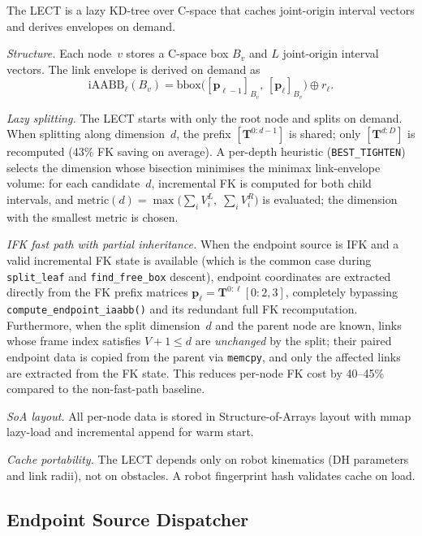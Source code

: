 \documentclass[journal]{IEEEtran}
\newcommand{\iAABB}{\text{iAABB}}
\newcommand{\bT}{\mathbf{T}}
\begin{document}
The LECT is a lazy KD-tree over C-space that caches joint-origin
interval vectors and derives envelopes on demand.

\emph{Structure.}
Each node~$v$ stores a C-space box $B_v$ and $L$ joint-origin
interval vectors.
The link envelope is derived on demand as
\begin{equation}\label{eq:lect_iaabb}
  \iAABB_\ell(B_v)=\mathrm{bbox}\!\bigl([\bm{p}_{\ell-1}]_{B_v},\,[\bm{p}_\ell]_{B_v}\bigr)\oplus r_\ell.
\end{equation}

\emph{Lazy splitting.}
The LECT starts with only the root node and splits on demand.
When splitting along dimension~$d$, the prefix $[\bT^{0:d-1}]$ is
shared; only $[\bT^{d:D}]$ is recomputed (43\% FK saving on average).
A per-depth heuristic (\texttt{BEST\_TIGHTEN}) selects the dimension
whose bisection minimises the minimax link-envelope volume:
for each candidate~$d$, incremental FK is computed for both child
intervals, and
$\text{metric}(d) = \max\bigl(\sum_i V_i^L,\; \sum_i V_i^R\bigr)$
is evaluated; the dimension with the smallest metric is chosen.

\emph{IFK fast path with partial inheritance.}
When the endpoint source is IFK and a valid incremental FK state is
available (which is the common case during \texttt{split\_leaf} and
\texttt{find\_free\_box} descent), endpoint coordinates are extracted
directly from the FK prefix matrices
$\bm{p}_\ell = \bT^{0:\ell}[0{:}2,3]$,
completely bypassing \texttt{compute\_endpoint\_iaabb()} and its
redundant full FK recomputation.
Furthermore, when the split dimension~$d$ and the parent node are
known, links whose frame index satisfies $V+1 \leq d$ are
\emph{unchanged} by the split; their paired endpoint data is copied
from the parent via \texttt{memcpy}, and only the affected links are
extracted from the FK state.
This reduces per-node FK cost by 40--45\% compared to the
non-fast-path baseline.

\emph{SoA layout.}
All per-node data is stored in Structure-of-Arrays layout with
mmap lazy-load and incremental append for warm start.

\emph{Cache portability.}
The LECT depends only on robot kinematics (DH parameters and link
radii), not on obstacles.
A robot fingerprint hash validates cache on load.

\subsection{Endpoint Source Dispatcher}\label{sec:endpoint_dispatch}
\end{document}
